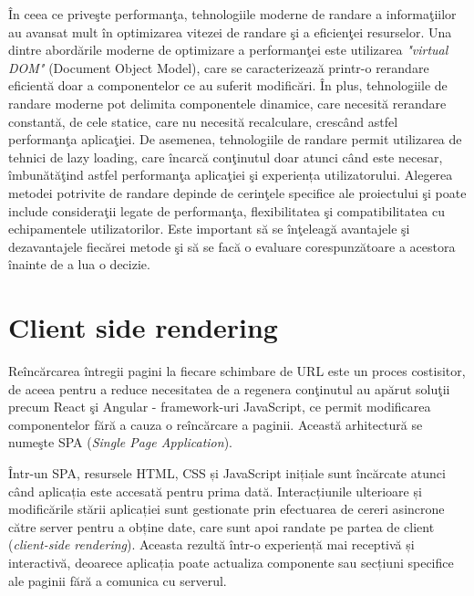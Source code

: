 \documentclass[12pt, a4paper]{report}
\begin{document}
\^ In ceea ce prive\c ste performan\c ta, tehnologiile moderne de randare a informa\c tiilor au avansat mult \^ in optimizarea vitezei de randare \c si a eficien\c tei resurselor. Una dintre abord\u arile moderne de optimizare a performan\c tei este utilizarea \emph{"virtual DOM"} (Document Object Model), care se caracterizează printr-o rerandare eficientă doar a componentelor ce au suferit modificări.
\^ In plus, tehnologiile de randare moderne pot delimita componentele dinamice, care necesită rerandare constantă, de cele statice, care nu necesit\u a recalculare, cresc\^ and astfel performan\c ta aplica\c tiei. De asemenea, tehnologiile de randare permit utilizarea de tehnici de lazy loading, care \^ incarc\u a con\c tinutul doar atunci c\^ and este necesar, \^ imbun\u at\u a\c tind astfel performan\c ta aplica\c tiei \c si experiența utilizatorului. \cite{virtual-dom}
Alegerea metodei potrivite de randare depinde de cerin\c tele specifice ale proiectului \c si poate include considera\c tii legate de performan\c ta, flexibilitatea \c si compatibilitatea cu echipamentele utilizatorilor. Este important s\u a se \^ in\c teleag\u a avantajele \c si dezavantajele fiec\u arei metode \c si s\u a se fac\u a o evaluare corespunz\u atoare a acestora \^ inainte de a lua o decizie.


\section{Client side rendering}

Re\^ inc\u arcarea \^ intregii pagini la fiecare schimbare de URL este un proces costisitor, de aceea pentru a reduce necesitatea de a regenera con\c tinutul au ap\u arut solu\c tii precum React \c si Angular - framework-uri JavaScript, ce permit modificarea componentelor f\u ar\u a a cauza o re\^ inc\u arcare a paginii. Aceast\u a arhitectur\u a se nume\c ste SPA (\textit{Single Page Application}).

Într-un SPA, resursele HTML, CSS și JavaScript inițiale sunt încărcate atunci când aplicația este accesată pentru prima dată. Interacțiunile ulterioare și modificările stării aplicației sunt gestionate prin efectuarea de cereri asincrone către server pentru a obține date, care sunt apoi randate pe partea de client (\textit{client-side rendering}). Aceasta rezultă \^intr-o experiență mai receptivă și interactivă, deoarece aplicația poate actualiza componente sau secțiuni specifice ale paginii fără a comunica cu serverul.
\end{document}
